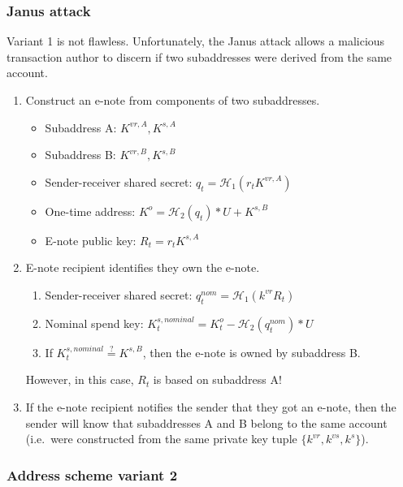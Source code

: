 \subsubsection{Janus attack}

Variant 1 is not flawless. Unfortunately, the Janus attack \cite{janus-attack} allows a malicious transaction author to discern if two subaddresses were derived from the same account.

\begin{enumerate}
    \item Construct an e-note from components of two subaddresses.
    \begin{itemize}
        \item Subaddress A: $K^{vr,A}, K^{s,A}$
        \item Subaddress B: $K^{vr,B}, K^{s,B}$
        \item Sender-receiver shared secret: $q_t = \mathcal{H}_1(r_t K^{vr,A})$
        \item One-time address: $K^o = \mathcal{H}_2(q_t)*U + K^{s,B}$
        \item E-note public key: $R_t = r_t K^{s,A}$
    \end{itemize}

    \item E-note recipient identifies they own the e-note.
    \begin{enumerate}
        \item Sender-receiver shared secret: $q^{nom}_t = \mathcal{H}_1(k^{vr} R_t)$
        \item Nominal spend key: $K^{s,nominal}_t = K^o_t - \mathcal{H}_2(q^{nom}_t)*U$
        \item If $K^{s,nominal}_t \stackrel{?}{=} K^{s,B}$, then the e-note is owned by subaddress B.
    \end{enumerate}
    
    However, in this case, $R_t$ is based on subaddress A!

    \item If the e-note recipient notifies the sender that they got an e-note, then the sender will know that subaddresses A and B belong to the same account (i.e.\ were constructed from the same private key tuple $\{k^{vr}, k^{vs}, k^s\}$).
\end{enumerate}

\subsubsection{Address scheme variant 2}

